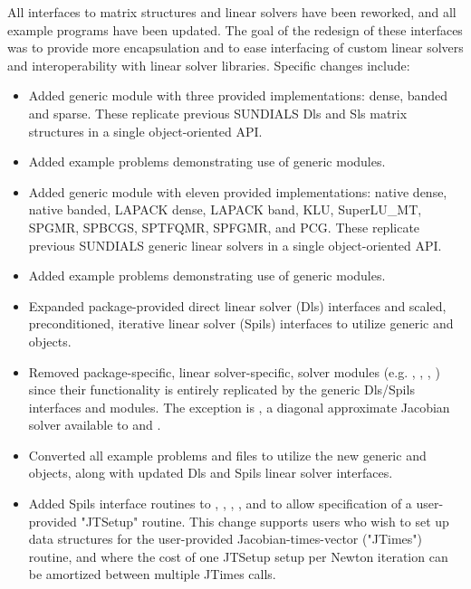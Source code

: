 All interfaces to matrix structures and linear solvers
have been reworked, and all example programs have been updated.
The goal of the redesign of these interfaces was to provide more encapsulation
and to ease interfacing of custom linear solvers and interoperability
with linear solver libraries.
Specific changes include:
\begin{itemize}
\item Added generic {\sunmatrix} module with three provided implementations:
        dense, banded and sparse.  These replicate previous SUNDIALS Dls and
        Sls matrix structures in a single object-oriented API.
\item Added example problems demonstrating use of generic {\sunmatrix} modules.
\item Added generic  module with eleven provided
        implementations: {\sundials} native dense, {\sundials} native banded,
        LAPACK dense, LAPACK band, KLU,
        SuperLU\_MT, SPGMR, SPBCGS, SPTFQMR, SPFGMR, and PCG.  These replicate
        previous SUNDIALS generic linear solvers in a single object-oriented
        API.
\item Added example problems demonstrating use of generic 
        modules.
\item Expanded package-provided direct linear solver (Dls) interfaces and
        scaled, preconditioned, iterative linear solver (Spils) interfaces
        to utilize generic {\sunmatrix} and  objects.
\item Removed package-specific, linear solver-specific, solver modules
        (e.g. , , , ) since their functionality
        is entirely replicated by the generic Dls/Spils interfaces and
         modules.  The exception is , a
        diagonal approximate Jacobian solver available to {\cvode} and {\cvodes}.
\item Converted all {\sundials} example problems and files to utilize the new generic
        {\sunmatrix} and  objects, along with updated Dls and
        Spils linear solver interfaces.
\item Added Spils interface routines to {\arkode}, {\cvode}, {\cvodes}, {\ida},
        and {\idas} to allow specification of a user-provided "JTSetup" routine.
        This change supports users who wish to set up data structures for
        the user-provided Jacobian-times-vector ("JTimes") routine, and
        where the cost of one JTSetup setup per Newton iteration can be
        amortized between multiple JTimes calls.
\end{itemize}

